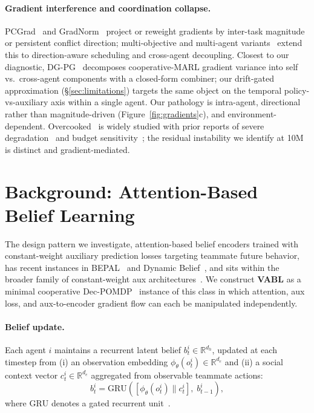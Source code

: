 \documentclass{article}
\theoremstyle{plain}
\theoremstyle{definition}
\theoremstyle{remark}
\begin{document}
\paragraph{Gradient interference and coordination collapse.}
PCGrad~\cite{yu2020gradient} and GradNorm~\cite{chen2018gradnorm}
project or reweight gradients by inter-task magnitude or persistent
conflict direction; multi-objective and multi-agent
variants~\cite{xiao2023sdmgrad,zhang2025mgda,tessera2025hypermarl,nekoei2023dealing}
extend this to direction-aware scheduling and cross-agent decoupling.
Closest to our diagnostic, DG-PG~\cite{yang2026dgpg} decomposes
cooperative-MARL gradient variance into self vs.\ cross-agent
components with a closed-form combiner; our drift-gated
approximation (\S\ref{sec:limitations}) targets the same object
on the temporal policy-vs-auxiliary axis within a single agent.
Our pathology is intra-agent, directional rather than
magnitude-driven (Figure~\ref{fig:gradients}c), and
environment-dependent. Overcooked~\cite{carroll2019utility} is
widely studied with prior reports of severe
degradation~\cite{yu2022surprising,rashid2020monotonic} and budget
sensitivity~\cite{formanek2024mirage}; the residual instability we
identify at 10M is distinct and gradient-mediated.


\section{Background: Attention-Based Belief Learning}
\label{sec:background}

The design pattern we investigate, attention-based belief encoders
trained with constant-weight auxiliary prediction losses targeting
teammate future behavior, has recent instances in
BEPAL~\cite{huang2025bepal} and Dynamic
Belief~\cite{zhai2023dynamic}, and sits within the broader family of
constant-weight aux
architectures~\cite{hafner2023mastering,schwarzer2021dataefficient,jaderberg2016reinforcement}.
We construct \textbf{VABL} as a minimal cooperative
Dec-POMDP~\cite{oliehoek2016concise} instance of this class in which
attention, aux loss, and aux-to-encoder gradient flow can each be
manipulated independently.

\paragraph{Belief update.}
Each agent $i$ maintains a recurrent latent belief $b_t^i \in
\mathbb{R}^{d_h}$, updated at each timestep from (i) an observation
embedding $\phi_\theta(o_t^i) \in \mathbb{R}^{d_e}$ and (ii) a social
context vector $c_t^i \in \mathbb{R}^{d_e}$ aggregated from observable
teammate actions:
\begin{equation}
    b_t^i = \mathrm{GRU}\left(
        [\phi_\theta(o_t^i) \| c_t^i],\; b_{t-1}^i
    \right),
\end{equation}
where $\mathrm{GRU}$ denotes a gated recurrent unit~\cite{cho2014gru}.
\end{document}
